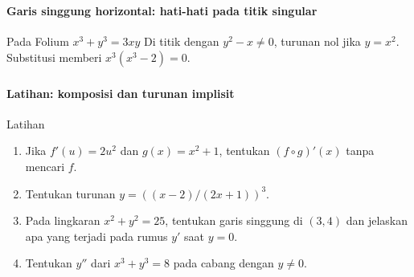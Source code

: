 \documentclass{../../kalkulus-ppt}
\begin{document}
\begin{frame}
\frametitle{\insertsection}
\framesubtitle{Garis singgung horizontal: hati-hati pada titik singular}

\begin{block}{Pada Folium $x^3+y^3=3xy$}
Di titik dengan $y^2-x\ne0$, turunan nol jika $y=x^2$.
Substitusi memberi $x^3(x^3-2)=0$.
\end{block}
\end{frame}


\begin{frame}
\frametitle{\insertsection}
\framesubtitle{Latihan: komposisi dan turunan implisit}

\begin{exampleblock}{Latihan}
\begin{enumerate}
\item Jika $f'(u)=2u^2$ dan $g(x)=x^2+1$, tentukan $(f\circ g)'(x)$ tanpa mencari $f$.
\item Tentukan turunan $y=((x-2)/(2x+1))^3$.
\item Pada lingkaran $x^2+y^2=25$, tentukan garis singgung di $(3,4)$ dan jelaskan apa yang terjadi pada rumus $y'$ saat $y=0$.
\item Tentukan $y''$ dari $x^3+y^3=8$ pada cabang dengan $y\ne0$.
\end{enumerate}
\end{exampleblock}
\end{frame}
\end{document}
